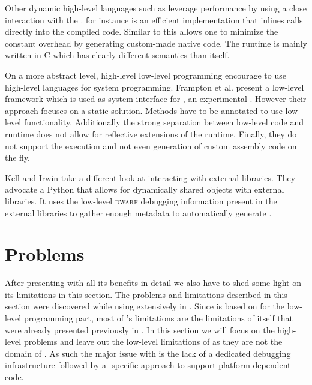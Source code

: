 Other dynamic high-level languages such as \Lua leverage \FFI performance by using a close interaction with the \JIT.
 for instance is an efficient \Lua implementation that inlines \FFI calls directly into the \JIT compiled code.
Similar to \NB this allows one to minimize the constant overhead by generating custom-made native code.
The \LuaJIT runtime is mainly written in C which has clearly different semantics than \Lua itself.

On a more abstract level, high-level low-level programming \cite{Fram09a} encourage to use high-level languages for system programming.
Frampton et al. present a low-level framework  which is used as system interface for \Jikes, an experimental \Java \VM.
However their approach focuses on a static solution.
Methods have to be annotated to use low-level functionality.
Additionally the strong separation between low-level code and runtime does not allow for reflective extensions of the runtime.
Finally, they do not support the execution and not even generation of custom assembly code on the fly.

Kell and Irwin \cite{Kell11a} take a different look at interacting with external libraries.
They advocate a Python \VM that allows for dynamically shared objects with external libraries.
It uses the low-level \textsc{dwarf} debugging information present in the external libraries to gather enough metadata to automatically generate \FFIs.

\section{Problems}

After presenting \NB with all its benefits in detail we also have to shed some light on its limitations in this section. 
The problems and limitations described in this section were discovered while using \NB extensively in \PH.
Since \NB is based on \B for the low-level programming part, most of \NB's limitations are the limitations of \B itself that were already presented previously in .
In this section we will focus on the high-level problems and leave out the low-level limitations of \B as they are not the domain of \NB.
As such the major issue with \NB is the lack of a dedicated debugging infrastructure followed by a \NB-specific approach to support platform dependent code.

